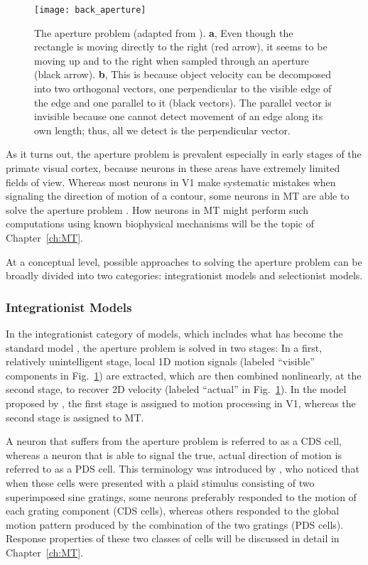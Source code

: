 \begin{figure}[t]
  \centering
  \texttt{[image: back\_aperture]}
  \caption{
  The aperture problem (adapted from \cite{BradleyGoyal2008}).
  \textbf{a}, Even though the rectangle is moving directly to the right
  (red arrow), it seems to be moving
  up and to the right when sampled through an aperture (black arrow).
  \textbf{b}, This is because object velocity can be decomposed into two
  orthogonal vectors, one perpendicular to the visible edge of the edge and one
  parallel to it (black vectors). 
  The parallel vector is invisible because one cannot detect movement 
  of an edge along its own length; 
  thus, all we detect is the perpendicular vector.}
  \label{fig:BKG|aperture}
\end{figure}

As it turns out, the aperture problem is prevalent especially
in early stages of the primate visual cortex, 
because neurons in these areas have extremely limited fields of view.
Whereas most neurons in \ac{V1} make systematic mistakes when
signaling the direction of motion of a contour, some neurons in \ac{MT}
are able to solve the aperture problem \citep{Movshon1985,Pack2001,Rust2006}.
How neurons in \ac{MT} might perform such computations using known
biophysical mechanisms will be the topic of Chapter~\ref{ch:MT}.

At a conceptual level, possible approaches to solving the aperture problem
can be broadly divided into two categories: 
integrationist models and selectionist models.


\subsubsection{Integrationist Models}
\label{sec:BKG|integrationist}
In the integrationist category of models, which includes what has become 
the standard model \citep{Heeger1996,SimoncelliHeeger1998}, 
the aperture problem is solved in two stages:
In a first, relatively unintelligent stage, local 1D motion signals
(labeled ``visible'' components in Fig.~\ref{fig:BKG|aperture}) are
extracted, which are then combined nonlinearly, at the second stage,
to recover 2D velocity (labeled ``actual'' in Fig.~\ref{fig:BKG|aperture}).
In the model proposed by \cite{SimoncelliHeeger1998}, the first stage
is assigned to motion processing in \ac{V1}, 
whereas the second stage is assigned to \ac{MT}.

A neuron that suffers from the aperture problem is referred to as
a \acf{CDS} cell, whereas a neuron that is able to signal the true, actual
direction of motion is referred to as a \acf{PDS} cell.
This terminology was introduced by \cite{Movshon1985}, who noticed that
when these cells were presented with a plaid stimulus consisting of two
superimposed sine gratings, 
some neurons preferably responded to the motion of each grating component
(\ac{CDS} cells), whereas others responded to the global motion pattern
produced by the combination of the two gratings (\ac{PDS} cells).
Response properties of these two classes of cells will be discussed in
detail in Chapter~\ref{ch:MT}.

